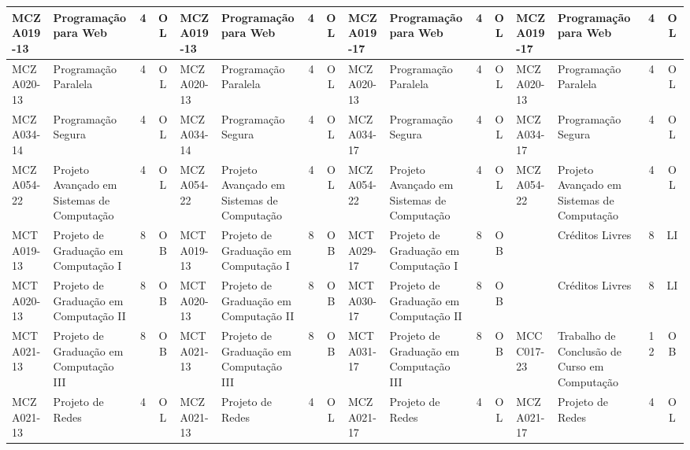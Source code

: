 \documentclass[a4paper]{article}
\begin{document}
\begin{landscape}
{\begin{longtable}{|l|p{.15\textheight}|c|c||l|p{.15\textheight}|c|c||l|p{.15\textheight}|c|c||l|p{.15\textheight}|c|c|}
    MCZA019-13 & Programação para Web & 4 & OL &
    MCZA019-13 & Programação para Web & 4 & OL &
    MCZA019-17 & Programação para Web & 4 & OL &
    MCZA019-17 & Programação para Web & 4 & OL \\ \hline
    
    MCZA020-13 & Programação Paralela & 4 & OL &
    MCZA020-13 & Programação Paralela & 4 & OL &
    MCZA020-13 & Programação Paralela & 4 & OL & 
    MCZA020-13 & Programação Paralela & 4 & OL \\ \hline
    
    MCZA034-14 & Programação Segura & 4 & OL &
    MCZA034-14 & Programação Segura & 4 & OL &
    MCZA034-17 & Programação Segura & 4 & OL &
    MCZA034-17 & Programação Segura & 4 & OL \\ \hline
    
    MCZA054-22 & Projeto Avançado em Sistemas de Computação & 4 & OL &
    MCZA054-22 & Projeto Avançado em Sistemas de Computação & 4 & OL &
    MCZA054-22 & Projeto Avançado em Sistemas de Computação & 4 & OL &
    MCZA054-22 & Projeto Avançado em Sistemas de Computação & 4 & OL \\ \hline

    
    MCTA019-13 & Projeto de Graduação em Computação I & 8 & OB &
    MCTA019-13 & Projeto de Graduação em Computação I & 8 & OB &
    MCTA029-17 & Projeto de Graduação em Computação I & 8 & OB &
               & Créditos Livres                      & 8 & LI &\\ \hline

    MCTA020-13 & Projeto de Graduação em Computação II & 8 & OB &
    MCTA020-13 & Projeto de Graduação em Computação II & 8 & OB &
    MCTA030-17 & Projeto de Graduação em Computação II & 8 & OB &
               & Créditos Livres                       & 8 & LI &\\ \hline

    MCTA021-13 & Projeto de Graduação em Computação III & 8 & OB &
    MCTA021-13 & Projeto de Graduação em Computação III & 8 & OB &
    MCTA031-17 & Projeto de Graduação em Computação III & 8 & OB &
    MCCC017-23 & Trabalho de Conclusão de Curso em Computação & 12 & OB \\ \hline

    MCZA021-13 & Projeto de Redes & 4 & OL &
    MCZA021-13 & Projeto de Redes & 4 & OL &
    MCZA021-17 & Projeto de Redes & 4 & OL &
    MCZA021-17 & Projeto de Redes & 4 & OL \\ \hline


\end{longtable}}
\end{landscape}
\end{document}
